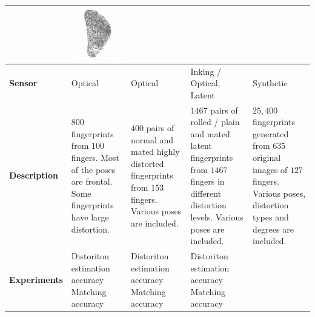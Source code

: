 \documentclass[journal]{IEEEtran}
\begin{document}
\begin{table}[!t]
\begin{tabular}{| m{1.5cm}<{\centering} | m{3.7cm}<{\centering} | m{3.7cm}<{\centering} | m{3.7cm}<{\centering} | m{3.7cm}<{\centering} |}
\begin{minipage}[][20mm][c]{.1\textwidth}
		\end{minipage}
		& \begin{minipage}[][20mm][c]{.1\textwidth}\centering
			\includegraphics[width=\linewidth]{images/db_ex_4.pdf}
		\end{minipage} \\
		\hline
		\textbf{Sensor} & Optical & Optical & Inking / Optical, Latent & Synthetic \\
		\hline
		\textbf{Description}
		& \multicolumn{1}{m{3.7cm}|}{$800$ fingerprints from $100$ fingers. Most of the poses are frontal. Some fingerprints have large distortion.} 
		& \multicolumn{1}{m{3.7cm}|}{$400$ pairs of normal and mated highly distorted fingerprints from $153$ fingers. Various poses are included.}
		& \multicolumn{1}{m{3.7cm}|}{$1467$ pairs of rolled / plain and mated latent fingerprints from $1467$ fingers in different distortion levels. Various poses are included.}
		& \multicolumn{1}{m{3.7cm}|}{$25,400$ fingerprints generated from $635$ original images of $127$ fingers. Various poses, distortion types and degrees are included.}\\
		\hline
		\textbf{Experiments} 
		& Distoriton estimation accuracy \newline Matching accuracy
		& Distoriton estimation accuracy \newline Matching accuracy
		& Distoriton estimation accuracy \newline Matching accuracy

\end{tabular}
\end{table}
\end{document}
